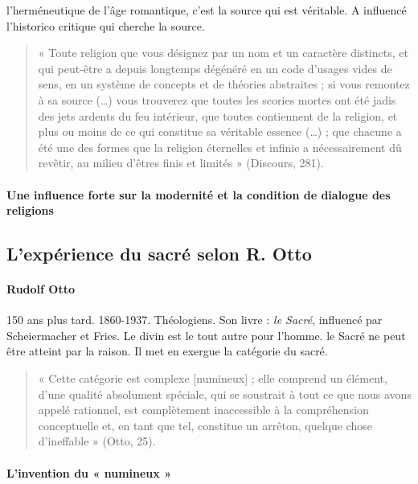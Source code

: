 l'herméneutique de l'âge romantique, c'est la source qui est véritable.  A influencé l'historico critique qui cherche la source.

\begin{quote}
    « Toute religion que vous désignez par un nom et un caractère distincts, et qui peut-être a depuis longtemps dégénéré en un code d’usages vides de sens, en un système de concepts et de théories abstraites ; si vous remontez à sa source (…) vous trouverez que toutes les scories mortes ont été jadis des jets ardents du feu intérieur, que toutes contiennent de la religion, et plus ou moins de ce qui constitue sa véritable essence (…) ; que chacune a été une des formes que la religion éternelles et infinie a nécessairement dû revêtir, au milieu d’êtres finis et limités » (Discours, 281). 
\end{quote}


\paragraph{Une influence forte sur la modernité et la condition de dialogue des religions}

\subsection{L’expérience du sacré selon R. Otto}

\paragraph{Rudolf Otto} 150 ans plus tard. 1860-1937. Théologiens. Son livre : \textit{le Sacré}, influencé par Scheiermacher et Fries. Le divin est le tout autre pour l'homme. le Sacré ne peut être atteint par la raison. Il met en exergue la catégorie du sacré. 

\begin{quote}
    « Cette catégorie est complexe [numineux] ; elle comprend un élément, d’une qualité absolument spéciale, qui se soustrait à tout ce que nous avons appelé rationnel, est complètement inaccessible à la compréhension conceptuelle et, en tant que tel, constitue un arrêton, quelque chose d’ineffable » (Otto, 25). 
\end{quote}

\paragraph{L’invention du « numineux »}


